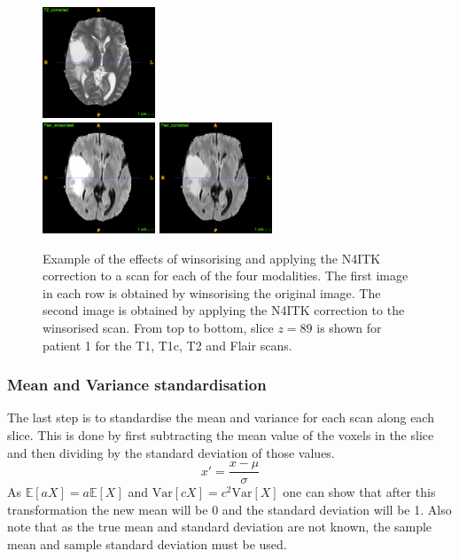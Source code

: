 \documentclass[12pt,a4paper,twoside,openright]{report}
\begin{document}
\begin{figure}
	\includegraphics[width=0.3\textwidth]{t2_n4itk_example} \\
	\vspace{0.5cm}
	\includegraphics[width=0.3\textwidth]{flair_winsorized_example}
	\includegraphics[width=0.3\textwidth]{flair_n4itk_example}
	\caption[Example of the effects of winsorising and applying the N4ITK correction to a scan for each of the four modalities.]{Example of the effects of winsorising and applying the N4ITK correction to a scan for each of the four modalities. The first image in each row is obtained by winsorising the original image. The second image is obtained by applying the N4ITK correction to the winsorised scan. From top to bottom, slice $z=89$ is shown for patient 1 for the T1, T1c, T2 and Flair scans.}
	\label{fig:n4itk_example}
\end{figure}

\subsubsection{Mean and Variance standardisation}
The last step is to standardise the mean and variance for each scan along each slice. This is done by first subtracting the mean value of the voxels in the slice and then dividing by the standard deviation of those values. 
\begin{equation}
	x' = \frac{x - \mu}{\sigma}
\end{equation}
As $\mathbb{E}[aX] = a \mathbb{E}[X]$ and $\textrm{Var} [cX] = c^2 \textrm{Var} [X]$ one can show that after this transformation the new mean will be 0 and the standard deviation will be 1. Also note that as the true mean and standard deviation are not known, the sample mean and sample standard deviation must be used. 
\end{document}

